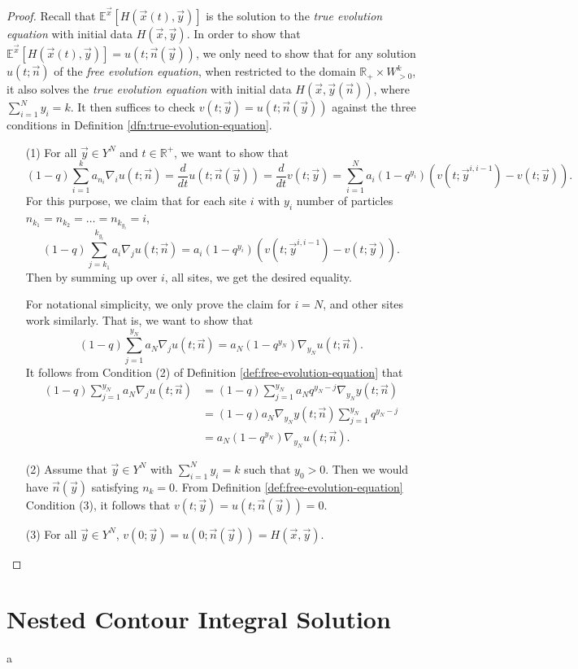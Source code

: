 \begin{proof}
Recall that $\mathbb{E}^{\vec{x}}[H(\vec{x}(t), \vec{y})]$ is the solution to the \emph{true evolution equation} with initial data $H(\vec{x}, \vec{y})$. In order to show that $\mathbb{E}^{\vec{x}}[H(\vec{x}(t), \vec{y})] = u(t;\vec{n}(\vec{y}))$, we only need to show that for any solution $u(t;\vec{n})$ of the \emph{free evolution equation}, when restricted to the domain $\mathbb{R}_+ \times W_{>0}^k$, it also solves the \emph{true evolution equation} with initial data $H(\vec{x},\vec{y}(\vec{n}))$, where $\sum_{i=1}^{N} y_i = k$. It then suffices to check $v(t;\vec{y}) = u(t; \vec{n}(\vec{y}))$ against the three conditions in Definition \ref{dfn:true-evolution-equation}. 
\begin{enumerate}
\item[(1)] For all $\vec{y} \in Y^N$ and $t \in \mathbb{R}^+$, we want to show that $$(1-q) \sum_{i=1}^{k} a_{n_i} \nabla_i u(t;\vec{n}) = \frac{d}{dt} u(t;\vec{n}(\vec{y}))= \frac{d}{dt} v(t;\vec{y}) = \sum_{i=1}^{N} a_i (1-q^{y_i}) (v(t;\vec{y}^{i,i-1}) - v(t;\vec{y})).$$ For this purpose, we claim that for each site $i$ with $y_i$ number of particles $n_{k_1} = n_{k_2} = \dots = n_{k_{y_i}} = i$, $$(1-q) \sum_{j=k_1}^{k_{y_i}} a_{i} \nabla_j u(t;\vec{n}) = a_i (1-q^{y_i}) (v(t;\vec{y}^{i,i-1}) - v(t;\vec{y})).$$ Then by summing up over $i$, all sites, we get the desired equality. 

For notational simplicity, we only prove the claim for $i = N$, and other sites work similarly. That is, we want to show that $$(1-q) \sum_{j=1}^{y_N} a_{N} \nabla_j u(t;\vec{n}) = a_N (1-q^{y_N}) \nabla_{y_N} u(t;\vec{n}).$$
It follows from Condition (2) of Definition \ref{def:free-evolution-equation} that
\begin{align*}
(1-q) \sum_{j=1}^{y_N} a_{N} \nabla_j u(t;\vec{n}) &= (1-q) \sum_{j=1}^{y_N} a_{N} q^{y_N - j} \nabla_{y_N} y(t;\vec{n})\\
&= (1-q) a_{N} \nabla_{y_N} y(t;\vec{n}) \sum_{j=1}^{y_N} q^{y_N - j}\\
&= a_N (1-q^{y_N}) \nabla_{y_N} u(t;\vec{n}).
\end{align*}
\item[(2)] Assume that $\vec{y} \in Y^N$ with $\sum_{i=1}^{N} y_i = k$ such that $y_0 > 0$. Then we would have $\vec{n}(\vec{y})$ satisfying $n_k = 0$. From Definition \ref{def:free-evolution-equation} Condition (3), it follows that $v(t;\vec{y}) = u(t;\vec{n}(\vec{y})) = 0$.
\item[(3)] For all $\vec{y} \in Y^N$, $v(0;\vec{y}) = u(0; \vec{n}(\vec{y})) = H(\vec{x},\vec{y})$.
\end{enumerate}
\end{proof}

\section{Nested Contour Integral Solution}
a